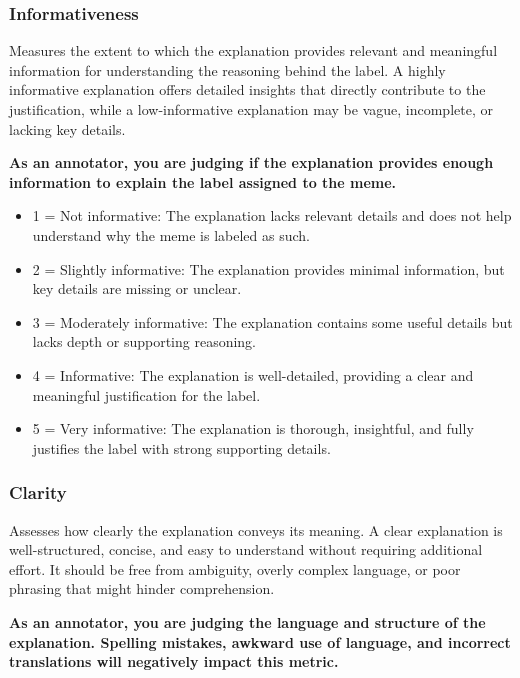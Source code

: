 \subsubsection{Informativeness}
Measures the extent to which the explanation provides relevant and meaningful information for understanding the reasoning behind the label. A highly informative explanation offers detailed insights that directly contribute to the justification, while a low-informative explanation may be vague, incomplete, or lacking key details.

\noindent
\textbf{As an annotator, you are judging if the explanation provides enough information to explain the label assigned to the meme.}

\begin{itemize}[noitemsep,topsep=0pt,labelsep=.5em] %
    \item 1 = Not informative: The explanation lacks relevant details and does not help understand why the meme is labeled as such.
    \item 2 = Slightly informative: The explanation provides minimal information, but key details are missing or unclear.
    \item 3 = Moderately informative: The explanation contains some useful details but lacks depth or supporting reasoning.
    \item 4 = Informative: The explanation is well-detailed, providing a clear and meaningful justification for the label.
    \item 5 = Very informative: The explanation is thorough, insightful, and fully justifies the label with strong supporting details.
\end{itemize}

\subsubsection{Clarity}
Assesses how clearly the explanation conveys its meaning. A clear explanation is well-structured, concise, and easy to understand without requiring additional effort. It should be free from ambiguity, overly complex language, or poor phrasing that might hinder comprehension.

\noindent
\textbf{As an annotator, you are judging the language and structure of the explanation. Spelling mistakes, awkward use of language, and incorrect translations will negatively impact this metric.}

